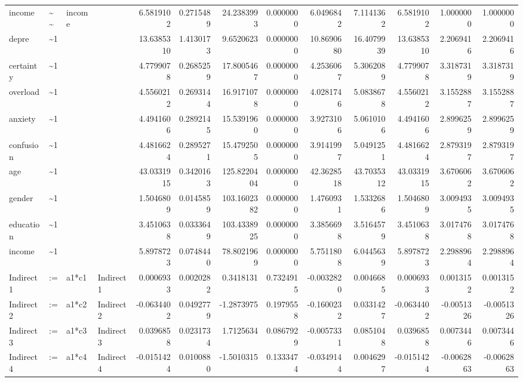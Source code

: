 \documentclass[
]{article}
\begin{document}
\begin{table}[!h]
\begin{tabular}[t]{llllrrrrrrrrr}
income & \textasciitilde{}\textasciitilde{} & income &  & 6.5819102 & 0.2715489 & 24.2383993 & 0.0000000 & 6.0496842 & 7.1141362 & 6.5819102 & 1.0000000 & 1.0000000\\
depre & \textasciitilde{}1 &  &  & 13.6385310 & 1.4130173 & 9.6520623 & 0.0000000 & 10.8690680 & 16.4079939 & 13.6385310 & 2.2069416 & 2.2069416\\
\addlinespace
certainty & \textasciitilde{}1 &  &  & 4.7799078 & 0.2685259 & 17.8005467 & 0.0000000 & 4.2536067 & 5.3062089 & 4.7799078 & 3.3187319 & 3.3187319\\
overload & \textasciitilde{}1 &  &  & 4.5560212 & 0.2693144 & 16.9171078 & 0.0000000 & 4.0281746 & 5.0838678 & 4.5560212 & 3.1552887 & 3.1552887\\
anxiety & \textasciitilde{}1 &  &  & 4.4941606 & 0.2892145 & 15.5391960 & 0.0000000 & 3.9273106 & 5.0610106 & 4.4941606 & 2.8996259 & 2.8996259\\
confusion & \textasciitilde{}1 &  &  & 4.4816624 & 0.2895271 & 15.4792505 & 0.0000000 & 3.9141997 & 5.0491251 & 4.4816624 & 2.8793197 & 2.8793197\\
age & \textasciitilde{}1 &  &  & 43.0331915 & 0.3420163 & 125.8220404 & 0.0000000 & 42.3628518 & 43.7035312 & 43.0331915 & 3.6706062 & 3.6706062\\
\addlinespace
gender & \textasciitilde{}1 &  &  & 1.5046809 & 0.0145859 & 103.1602382 & 0.0000000 & 1.4760931 & 1.5332686 & 1.5046809 & 3.0094935 & 3.0094935\\
education & \textasciitilde{}1 &  &  & 3.4510638 & 0.0333649 & 103.4338925 & 0.0000000 & 3.3856698 & 3.5164579 & 3.4510638 & 3.0174768 & 3.0174768\\
income & \textasciitilde{}1 &  &  & 5.8978723 & 0.0748440 & 78.8021969 & 0.0000000 & 5.7511808 & 6.0445639 & 5.8978723 & 2.2988964 & 2.2988964\\
Indirect1 & := & a1*c1 & Indirect1 & 0.0006933 & 0.0020282 & 0.3418131 & 0.7324915 & -0.0032820 & 0.0046685 & 0.0006933 & 0.0013152 & 0.0013152\\
Indirect2 & := & a1*c2 & Indirect2 & -0.0634402 & 0.0492779 & -1.2873975 & 0.1979558 & -0.1600232 & 0.0331427 & -0.0634402 & -0.0051326 & -0.0051326\\
\addlinespace
Indirect3 & := & a1*c3 & Indirect3 & 0.0396858 & 0.0231734 & 1.7125634 & 0.0867929 & -0.0057331 & 0.0851048 & 0.0396858 & 0.0073446 & 0.0073446\\
Indirect4 & := & a1*c4 & Indirect4 & -0.0151424 & 0.0100880 & -1.5010315 & 0.1333474 & -0.0349144 & 0.0046297 & -0.0151424 & -0.0062863 & -0.0062863\\

\end{tabular}
\end{table}
\end{document}
